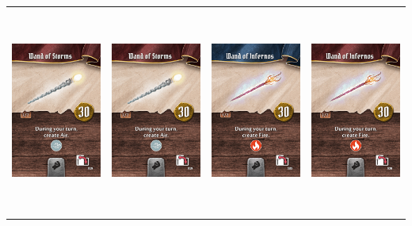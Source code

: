 \documentclass{minimal}
\begin{document}
{\begin{longtable}{llll}
\includegraphics[width=44mm,height=68mm]{./64-151/gh-084b-wand-of-storms.png} &
\includegraphics[width=44mm,height=68mm]{./64-151/gh-084b-wand-of-storms.png} &
\includegraphics[width=44mm,height=68mm]{./64-151/gh-085a-wand-of-infernos.png} &
\includegraphics[width=44mm,height=68mm]{./64-151/gh-085b-wand-of-infernos.png}\\ 

\end{longtable}}
\end{document}
